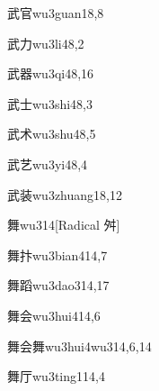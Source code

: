 \begin{entry}{武官}{wu3guan1}{8,8}
\end{entry}

\begin{entry}{武力}{wu3li4}{8,2}
\end{entry}

\begin{entry}{武器}{wu3qi4}{8,16}
\end{entry}

\begin{entry}{武士}{wu3shi4}{8,3}
\end{entry}

\begin{entry}{武术}{wu3shu4}{8,5}
\end{entry}

\begin{entry}{武艺}{wu3yi4}{8,4}
\end{entry}

\begin{entry}{武装}{wu3zhuang1}{8,12}
\end{entry}

\begin{entry}{舞}{wu3}{14}[Radical 舛]
\end{entry}

\begin{entry}{舞抃}{wu3bian4}{14,7}
\end{entry}

\begin{entry}{舞蹈}{wu3dao3}{14,17}
\end{entry}

\begin{entry}{舞会}{wu3hui4}{14,6}
\end{entry}

\begin{entry}{舞会舞}{wu3hui4wu3}{14,6,14}
\end{entry}

\begin{entry}{舞厅}{wu3ting1}{14,4}
\end{entry}

